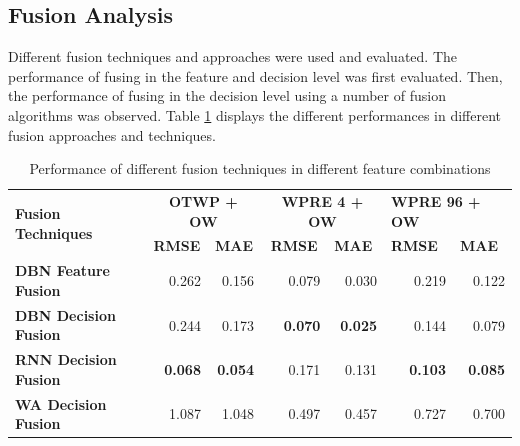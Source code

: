 \subsection{Fusion Analysis}
Different fusion techniques and approaches were used and evaluated. The performance of fusing in the feature and decision level was first evaluated. Then, the performance of fusing in the decision level using a number of fusion algorithms was observed. Table \ref{table:fusion_results} displays the different performances in different fusion approaches and techniques. 

\begin{table}[]
\begin{tabular}{|l|r|r|r|r|r|r|}
\hline
\multirow{2}{*}{\textbf{Fusion Techniques}} & \multicolumn{2}{c|}{\textbf{OTWP + OW}}                                & \multicolumn{2}{c|}{\textbf{WPRE 4 + OW}}                              & \multicolumn{2}{l|}{\textbf{WPRE 96 + OW}}                             \\ \cline{2-7} 
                                            & \multicolumn{1}{c|}{\textbf{RMSE}} & \multicolumn{1}{l|}{\textbf{MAE}} & \multicolumn{1}{c|}{\textbf{RMSE}} & \multicolumn{1}{l|}{\textbf{MAE}} & \multicolumn{1}{l|}{\textbf{RMSE}} & \multicolumn{1}{l|}{\textbf{MAE}} \\ \hline
\textbf{DBN Feature Fusion}                 & 0.262                              & 0.156                             & 0.079                              & 0.030                             & 0.219                              & 0.122                             \\ \hline
\textbf{DBN Decision Fusion}                & 0.244                              & 0.173                             & \textbf{0.070}                     & \textbf{0.025}                    & 0.144                              & 0.079                             \\ \hline
\textbf{RNN Decision Fusion}                & \textbf{0.068}                     & \textbf{0.054}                    & 0.171                              & 0.131                             & \textbf{0.103}                     & \textbf{0.085}                    \\ \hline
\textbf{WA Decision Fusion}                 & 1.087                              & 1.048                             & 0.497                              & 0.457                             & 0.727                              & 0.700                             \\ \hline
\end{tabular}
\caption{Performance of different fusion techniques in different feature combinations}
\label{table:fusion_results}
\end{table}

